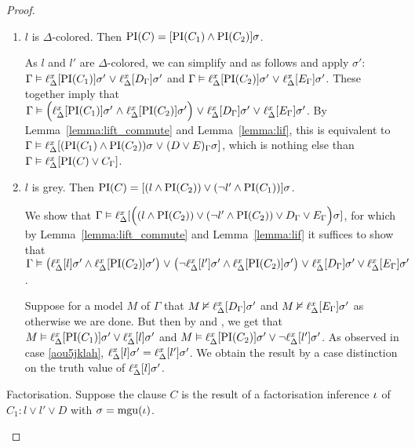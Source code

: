 \begin{proof}
\begin{description}
\begin{enumerate}
				\item $l$ is $\Delta$-colored. Then $\operatorname{PI}(C) = [\operatorname{PI}(C_1) \land \operatorname{PI}(C_2)]\sigma$.

					As $l$ and $l'$ are $\Delta$-colored, we can simplify \markA{} and \markB{} as follows and apply $\sigma'$:
					$\Gamma \vDash \ell_{\Delta}^{x}[\operatorname{PI}(C_1)]\sigma' \;{\lor}\; \ell_{\Delta}^{x}[D_\Gamma]\sigma' $ and $\Gamma \vDash \ell_{\Delta}^{x}[\operatorname{PI}(C_2)]\sigma' \;{\lor}\; \ell_{\Delta}^{x}[E_\Gamma]\sigma'$.
					These together imply that 
					$\Gamma \vDash \Big(\ell_{\Delta}^{x}[\operatorname{PI}(C_1)]\sigma' \;{\land}\; \ell_{\Delta}^{x}[\operatorname{PI}(C_2)]\sigma'\Big) \;{\lor}\;\allowbreak \ell_{\Delta}^{x}[D_\Gamma]\sigma' \;{\lor}\;\allowbreak \ell_{\Delta}^{x}[E_\Gamma]\sigma'$.
					By Lemma~\ref{lemma:lift_commute} and Lemma~\ref{lemma:lif}, this is equivalent to 
					$\Gamma \vDash \ell_{\Delta}^{x}[(\operatorname{PI}(C_1) \land \operatorname{PI}(C_2))\sigma \;{\lor}\; (D \lor E)_\Gamma\sigma]$, which is nothing else than
					$\Gamma \vDash \ell_{\Delta}^{x}[\operatorname{PI}(C) \lor C_\Gamma]$.

				\item $l$ is grey. Then $\operatorname{PI}(C) = [(l \land \operatorname{PI}(C_2) ) \lor (\lnot l' \land \operatorname{PI}(C_1))]\sigma$.

					We show that $\Gamma \vDash\allowbreak \ell_{\Delta}^{x}[ \Big((l \land \operatorname{PI}(C_2) ) \lor\allowbreak (\lnot l' \land \operatorname{PI}(C_2)) \lor D_\Gamma \lor E_\Gamma\Big)\sigma]$, for which by Lemma~\ref{lemma:lift_commute} and Lemma~\ref{lemma:lif} it suffices to show that 
					$\Gamma \vDash\allowbreak \big(\ell_{\Delta}^{x}[l]\sigma' \land \ell_{\Delta}^{x}[\operatorname{PI}(C_2)]\sigma'\big)\;{\lor}\;\allowbreak \big(\lnot \ell_{\Delta}^{x}[l']\sigma' \land \ell_{\Delta}^{x}[\operatorname{PI}(C_2)]\sigma'\big)\;{\lor}\;\allowbreak \ell_{\Delta}^{x}[D_\Gamma]\sigma' \lor \ell_{\Delta}^{x}[E_\Gamma]\sigma'$.

					Suppose for a model $M$ of $\Gamma$ that  $M \nvDash \ell_{\Delta}^{x}[D_\Gamma]\sigma'$ and $M\nvDash \ell_{\Delta}^{x}[E_\Gamma]\sigma'$ as otherwise we are done.
					But then by \markA{} and \markB{}, we get that 
					$M \vDash \ell_{\Delta}^{x}[\operatorname{PI}(C_1)]\sigma' \lor \ell_{\Delta}^{x}[l]\sigma'$ and
					$M \entails\nolinebreak \lifdelta{\PI(C_2)}\sigma' \lor \lnot\lifdelta{l'}\sigma'$.
					As observed in case \ref{aou5jklah}, $\ell_{\Delta}^{x}[l]\sigma' = \ell_{\Delta}^{x}[l']\sigma'$.
					We obtain the result by a case distinction on the truth value of $\ell_{\Delta}^{x}[l]\sigma'$.

			\end{enumerate}

		\item{Factorisation.}
			Suppose the clause $C$ is the result of a factorisation inference $\iota$ of $C_1: l \lor l' \lor D$ with $\sigma=\operatorname{mgu}(\iota)$.


\end{description}
\end{proof}
